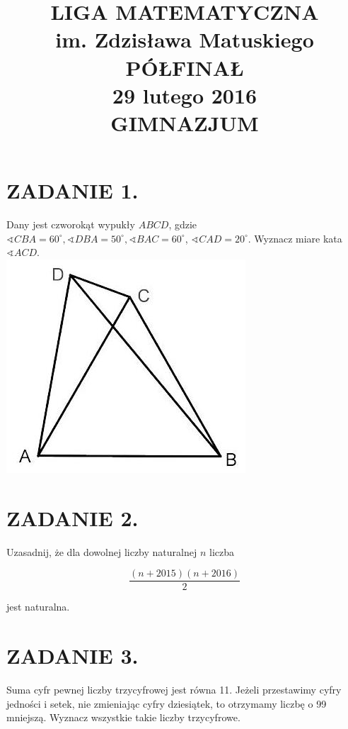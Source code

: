 \documentclass[10pt]{article}
\title{LIGA MATEMATYCZNA \\
 im. Zdzisława Matuskiego \\
 PÓŁFINAŁ \\
 29 lutego 2016 \\
 GIMNAZJUM }
\author{}
\date{}
\newcommand\varangle{\mathop{\sphericalangle}}
\begin{document}
\maketitle
\section*{ZADANIE 1.}
Dany jest czworokąt wypukły \(A B C D\), gdzie \(\varangle C B A=60^{\circ}, \varangle D B A=50^{\circ}, \varangle B A C=60^{\circ}\), \(\varangle C A D=20^{\circ}\). Wyznacz miare kata \(\varangle A C D\).\\
\includegraphics[max width=\textwidth, center]{2024_11_21_dc6490e81fa2cf87933ag-1}

\section*{ZADANIE 2.}
Uzasadnij, że dla dowolnej liczby naturalnej \(n\) liczba

\[
\frac{(n+2015)(n+2016)}{2}
\]

jest naturalna.

\section*{ZADANIE 3.}
Suma cyfr pewnej liczby trzycyfrowej jest równa 11. Jeżeli przestawimy cyfry jedności i setek, nie zmieniając cyfry dziesiątek, to otrzymamy liczbę o 99 mniejszą. Wyznacz wszystkie takie liczby trzycyfrowe.
\end{document}
